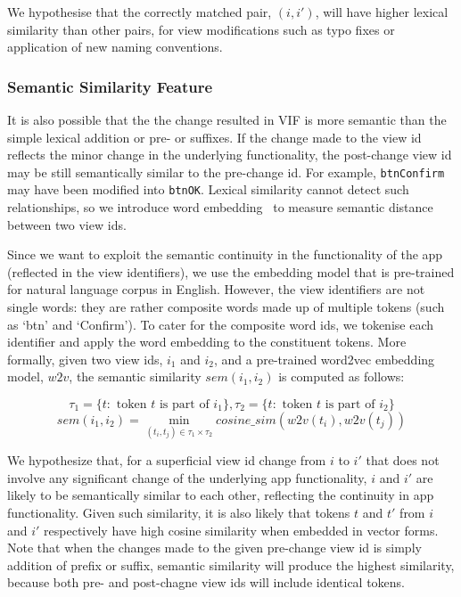 \documentclass[sigconf]{acmart}
\begin{document}
We hypothesise that the correctly matched pair, $(i, i')$, will have higher
lexical similarity than other pairs, for view modifications such as typo fixes
or application of new naming conventions.

\subsubsection{Semantic Similarity Feature}
\label{sec:semantic}

It is also possible that the the change resulted in VIF is more semantic than
the simple lexical addition or pre- or suffixes. If the change made to the
view id reflects the minor change in the underlying functionality, the
post-change view id may be still semantically similar to the pre-change id.
For example, \lstinline+btnConfirm+ may have been modified into \lstinline+btnOK+. Lexical similarity cannot detect such relationships, so we introduce
word embedding~\cite{Mikolov:2013rw} to measure semantic distance between two
view ids.

Since we want to exploit the semantic continuity in the functionality of the
app (reflected in the view identifiers), we use the embedding model that is
pre-trained for natural language corpus in English. However, the view
identifiers are not single words: they are rather composite words made up of
multiple tokens (such as `btn' and `Confirm'). To cater for the composite word
ids, we tokenise each identifier and apply the word embedding to the
constituent tokens. More formally, given two view ids, $i_1$ and $i_2$, and a pre-trained word2vec embedding model, $w2v$, the semantic similarity $sem(i_1, i_2)$ is computed as follows:

\[\tau_1 = \{t : \mbox{ token } t \mbox{ is part of } i_1\}, \tau_2 = \{t : \mbox{ token } t \mbox{ is part of } i_2\}\]
\[sem(i_1, i_2) = \min_{(t_i, t_j) \in \tau_1\times\tau_2}{cosine\_sim(w2v(t_i), w2v(t_j))}\]

We hypothesize that, for a superficial view id change from $i$ to $i'$ that
does not involve any significant change of the underlying app functionality,
$i$ and $i'$ are likely to be semantically similar to each other, reflecting
the continuity in app functionality. Given such similarity, it is also likely
that tokens $t$ and $t'$ from $i$ and $i'$ respectively have high cosine
similarity when embedded in vector forms. Note that when the changes made to
the given pre-change view id is simply addition of prefix or suffix, semantic
similarity will produce the highest similarity, because both pre- and
post-chagne view ids will include identical tokens.
\end{document}
